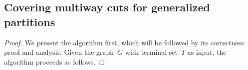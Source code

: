 \subsection{Covering multiway cuts for generalized partitions} \label{sec:coveringg:multiway}
\lemCoveringCorollary*
\begin{proof}
%
We present the algorithm first, which will be followed by its correctness proof and analysis. Given the graph~$G$ with terminal set~$T$ as input, the algorithm proceeds as follows.


\end{proof}
